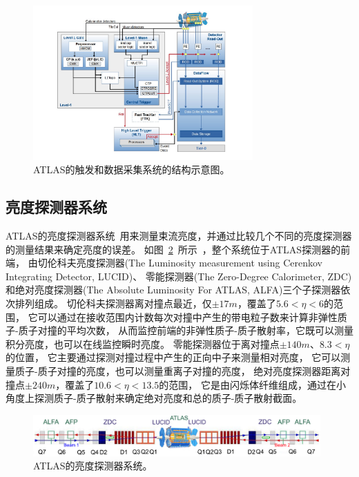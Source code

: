 \begin{figure}
  \begin{center}
    \includegraphics[width=0.75\textwidth]{figuresEXP/ATLASTS1.jpg}
  \end{center}
  \caption{
ATLAS的触发和数据采集系统的结构示意图。
  }
    \label{fig:ATLASTS1}
\end{figure}

\subsection{亮度探测器系统}
\label{sec:ATLASLD}

ATLAS的亮度探测器系统~\cite{ATLASLUMID}用来测量束流亮度，并通过比较几个不同的亮度探测器的测量结果来确定亮度的误差。
如图~\ref{fig:ATLASLD1}~所示~\cite{LDIm}，整个系统位于ATLAS探测器的前端，
由切伦科夫亮度探测器(The Luminosity measurement using Cerenkov Integrating Detector, LUCID)、
零能探测器(The Zero-Degree Calorimeter, ZDC)和绝对亮度探测器(The Absolute Luminosity For ATLAS, ALFA)三个子探测器依次排列组成。
切伦科夫探测器离对撞点最近，仅$\pm 17m$，覆盖了$5.6<\eta<6$的范围，
它可以通过在接收范围内计数每次对撞中产生的带电粒子数来计算非弹性质子-质子对撞的平均次数，
从而监控前端的非弹性质子-质子散射率，它既可以测量积分亮度，也可以在线监控瞬时亮度。
零能探测器位于离对撞点$\pm 140m$、$8.3<\eta$的位置，
它主要通过探测对撞过程中产生的正向中子来测量相对亮度，
它可以测量质子-质子对撞的亮度，也可以测量重离子对撞的亮度，
绝对亮度探测器距离对撞点$\pm 240m$，覆盖了$10.6<\eta<13.5$的范围，
它是由闪烁体纤维组成，通过在小角度上探测质子-质子散射来确定绝对亮度和总的质子-质子散射截面。

\begin{figure}
  \begin{center}
    \includegraphics[width=0.98\textwidth]{figuresEXP/ATLASLD1.jpg}
  \end{center}
  \caption{
ATLAS的亮度探测器系统。
  }
    \label{fig:ATLASLD1}
\end{figure}


